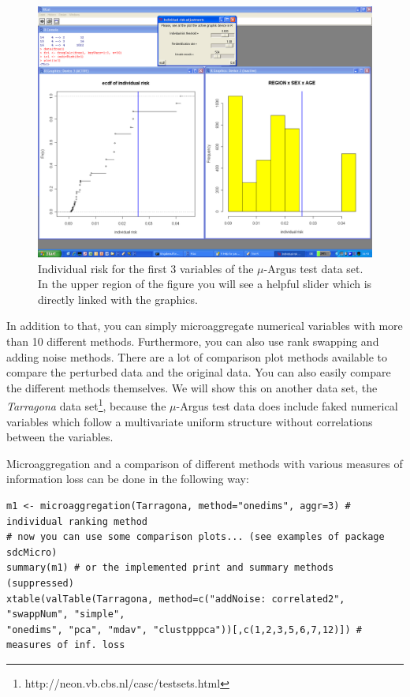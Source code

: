 \documentclass[12pt]{article}
\begin{document}
\begin{figure}
\begin{center}
\includegraphics[width=12cm]{risk2.PNG}
\caption{Individual risk for the first 3 variables of the $\mu$-Argus test data set. In the upper region of the figure you will see a helpful slider which is directly linked with the graphics.}
\label{risk}
\end{center}
\end{figure} 

In addition to that, you can simply microaggregate numerical variables with more than 10 different methods. Furthermore, you can also use rank swapping and adding noise methods. There are a lot of comparison plot methods available to compare the perturbed data and the original data. You can also easily compare the different methods themselves. We will show this on another data set, the {\it Tarragona} data set\footnote{http://neon.vb.cbs.nl/casc/testsets.html}, because the $\mu$-Argus test data does include faked numerical variables which follow a multivariate uniform structure without correlations between the variables.

Microaggregation and a comparison of different methods with various measures of information loss can be done in the following way:

\begin{footnotesize}
\begin{verbatim}
m1 <- microaggregation(Tarragona, method="onedims", aggr=3) # individual ranking method
# now you can use some comparison plots... (see examples of package sdcMicro)
summary(m1) # or the implemented print and summary methods (suppressed)
xtable(valTable(Tarragona, method=c("addNoise: correlated2", "swappNum", "simple",
"onedims", "pca", "mdav", "clustpppca"))[,c(1,2,3,5,6,7,12)]) # measures of inf. loss 
\end{verbatim}
\end{footnotesize}
\end{document}
